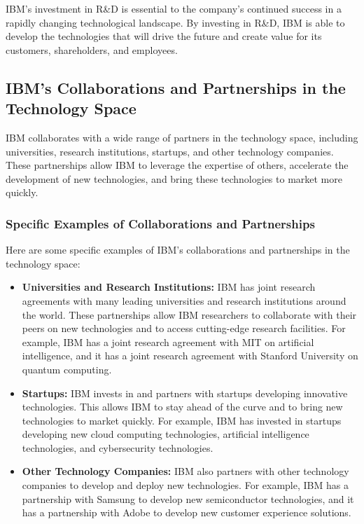 IBM's investment in R\&D is essential to the company's continued success in a rapidly changing technological landscape. By investing in R\&D, IBM is able to develop the technologies that will drive the future and create value for its customers, shareholders, and employees.

\subsection{IBM's Collaborations and Partnerships in the Technology Space}

IBM collaborates with a wide range of partners in the technology space, including universities, research institutions, startups, and other technology companies. These partnerships allow IBM to leverage the expertise of others, accelerate the development of new technologies, and bring these technologies to market more quickly.

\subsubsection{Specific Examples of Collaborations and Partnerships}

Here are some specific examples of IBM's collaborations and partnerships in the technology space:

\begin{itemize}
  \item \textbf{Universities and Research Institutions:} IBM has joint research agreements with many leading universities and research institutions around the world. These partnerships allow IBM researchers to collaborate with their peers on new technologies and to access cutting-edge research facilities. For example, IBM has a joint research agreement with MIT on artificial intelligence, and it has a joint research agreement with Stanford University on quantum computing.
  
  \item \textbf{Startups:} IBM invests in and partners with startups developing innovative technologies. This allows IBM to stay ahead of the curve and to bring new technologies to market quickly. For example, IBM has invested in startups developing new cloud computing technologies, artificial intelligence technologies, and cybersecurity technologies.
  
  \item \textbf{Other Technology Companies:} IBM also partners with other technology companies to develop and deploy new technologies. For example, IBM has a partnership with Samsung to develop new semiconductor technologies, and it has a partnership with Adobe to develop new customer experience solutions.
\end{itemize}

